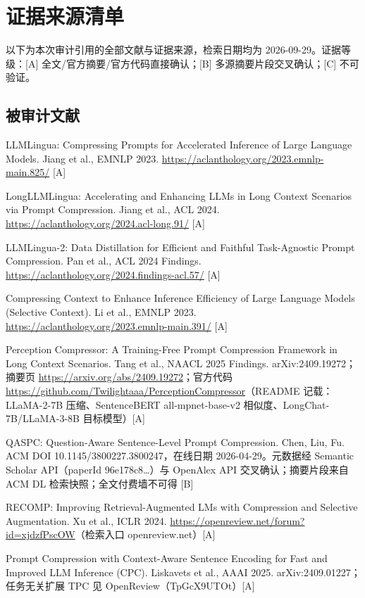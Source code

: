 \section{证据来源清单}
\label{sec:appendix}

以下为本次审计引用的全部文献与证据来源，检索日期均为 2026-09-29。证据等级：[A] 全文/官方摘要/官方代码直接确认；[B] 多源摘要片段交叉确认；[C] 不可验证。

\subsection*{被审计文献}

\begin{enumerate}[itemsep=1pt,label={[\arabic*]}]
\item LLMLingua: Compressing Prompts for Accelerated Inference of Large Language Models. Jiang et al., EMNLP 2023. \url{https://aclanthology.org/2023.emnlp-main.825/} [A]
\item LongLLMLingua: Accelerating and Enhancing LLMs in Long Context Scenarios via Prompt Compression. Jiang et al., ACL 2024. \url{https://aclanthology.org/2024.acl-long.91/} [A]
\item LLMLingua-2: Data Distillation for Efficient and Faithful Task-Agnostic Prompt Compression. Pan et al., ACL 2024 Findings. \url{https://aclanthology.org/2024.findings-acl.57/} [A]
\item Compressing Context to Enhance Inference Efficiency of Large Language Models (Selective Context). Li et al., EMNLP 2023. \url{https://aclanthology.org/2023.emnlp-main.391/} [A]
\item Perception Compressor: A Training-Free Prompt Compression Framework in Long Context Scenarios. Tang et al., NAACL 2025 Findings. arXiv:2409.19272；摘要页 \url{https://arxiv.org/abs/2409.19272}；官方代码 \url{https://github.com/Twilightaaa/PerceptionCompressor}（README 记载：LLaMA-2-7B 压缩、SentenceBERT all-mpnet-base-v2 相似度、LongChat-7B/LLaMA-3-8B 目标模型）[A]
\item QASPC: Question-Aware Sentence-Level Prompt Compression. Chen, Liu, Fu. ACM DOI 10.1145/3800227.3800247，在线日期 2026-04-29。元数据经 Semantic Scholar API（paperId 96e178c8\dots）与 OpenAlex API 交叉确认；摘要片段来自 ACM DL 检索快照；全文付费墙不可得 [B]
\item RECOMP: Improving Retrieval-Augmented LMs with Compression and Selective Augmentation. Xu et al., ICLR 2024. \url{https://openreview.net/forum?id=xjdzfPscOW}（检索入口 openreview.net）[A]
\item Prompt Compression with Context-Aware Sentence Encoding for Fast and Improved LLM Inference (CPC). Liskavets et al., AAAI 2025. arXiv:2409.01227；任务无关扩展 TPC 见 OpenReview（TpGcX9UTOt）[A]

\end{enumerate}
